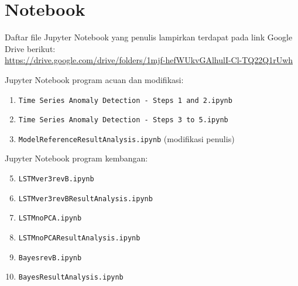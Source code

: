 \chapter{Notebook}

Daftar file Jupyter Notebook yang penulis lampirkan terdapat pada link Google Drive berikut: \\
\url{https://drive.google.com/drive/folders/1mjf-hefWUkvGAlhulI-Cl-TQ22Q1rUwh}

Jupyter Notebook program acuan dan modifikasi:
\begin{enumerate}[label=\textbf{L.\arabic*}]
    \item \texttt{Time Series Anomaly Detection -  Steps 1 and 2.ipynb}
    \item \texttt{Time Series Anomaly Detection - Steps 3 to 5.ipynb}
    \item \texttt{Model\textunderscore Reference\textunderscore Result\textunderscore Analysis.ipynb} (modifikasi penulis) \label{refmodified_ipynb}
\end{enumerate}

Jupyter Notebook program kembangan:
\begin{enumerate}[label=\textbf{L.\arabic*}]
    \setcounter{enumi}{4}
    \item \texttt{LSTM\textunderscore ver3\textunderscore revB.ipynb} \label{lstm_pca_ipynb}
    \item \texttt{LSTM\textunderscore ver3\textunderscore revB\textunderscore Result\textunderscore Analysis.ipynb} \label{lstm_pca_res_ipynb}
    \item \texttt{LSTM\textunderscore noPCA.ipynb} \label{lstm_nopca_ipynb}
    \item \texttt{LSTM\textunderscore noPCA\textunderscore Result\textunderscore Analysis.ipynb} \label{lstm_pca_res_ipynb}
    \item \texttt{Bayes\textunderscore revB.ipynb} \label{bayes_ipynb}
    \item \texttt{Bayes\textunderscore Result\textunderscore Analysis.ipynb} \label{lstm_pca_res_ipynb}
\end{enumerate}
